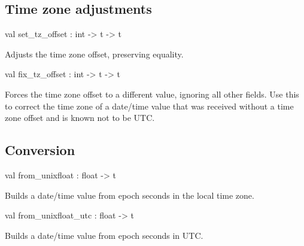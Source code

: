 \documentclass[11pt]{article}
\begin{document}
\subsection{Time zone adjustments}




\label{val:XmlRpcDateTime.set-underscoretz-underscoreoffset}\begin{ocamldoccode}
val set_tz_offset : int -> t -> t
\end{ocamldoccode}
\begin{ocamldocdescription}
Adjusts the time zone offset, preserving equality.


\end{ocamldocdescription}




\label{val:XmlRpcDateTime.fix-underscoretz-underscoreoffset}\begin{ocamldoccode}
val fix_tz_offset : int -> t -> t
\end{ocamldoccode}
\begin{ocamldocdescription}
Forces the time zone offset to a different value, ignoring all other
    fields. Use this to correct the time zone of a date/time value that
    was received without a time zone offset and is known not to be UTC.


\end{ocamldocdescription}




\subsection{Conversion}




\label{val:XmlRpcDateTime.from-underscoreunixfloat}\begin{ocamldoccode}
val from_unixfloat : float -> t
\end{ocamldoccode}
\begin{ocamldocdescription}
Builds a date/time value from epoch seconds in the local time zone.


\end{ocamldocdescription}




\label{val:XmlRpcDateTime.from-underscoreunixfloat-underscoreutc}\begin{ocamldoccode}
val from_unixfloat_utc : float -> t
\end{ocamldoccode}
\begin{ocamldocdescription}
Builds a date/time value from epoch seconds in UTC.


\end{ocamldocdescription}
\end{document}
